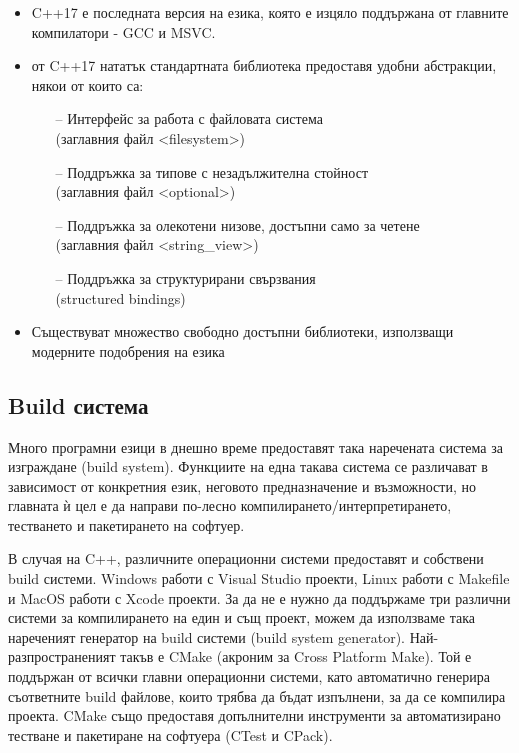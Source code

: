 \begin{itemize}
    \item C++17 е последната версия на езика, която е изцяло поддържана от
          главните компилатори - GCC и MSVC.
    \item от C++17 нататък стандартната библиотека предоставя удобни абстракции,
          някои от които са:
    \begin{itemize}
        \item[--] Интерфейс за работа с файловата система \\
                  (заглавния файл <filesystem>)
        \item[--] Поддръжка за типове с незадължителна стойност \\
                  (заглавния файл <optional>)
        \item[--] Поддръжка за олекотени низове, достъпни само за четене \\
                  (заглавния файл <string\_view>)
        \item[--] Поддръжка за структурирани свързвания \\
                  (structured bindings)
    \end{itemize}
    \item Съществуват множество свободно достъпни библиотеки, използващи
          модерните подобрения на езика
\end{itemize}


\subsection{Build система}

Много програмни езици в днешно време предоставят така наречената система за
изграждане (build system). Функциите на една такава система се различават в
зависимост от конкретния език, неговото предназначение и възможности,
но главната ѝ цел е да направи по-лесно компилирането/интерпретирането,
тестването и пакетирането на софтуер.

В случая на C++, различните операционни системи предоставят и собствени build
системи. Windows работи с Visual Studio проекти, Linux работи с Makefile и MacOS
работи с Xcode проекти. За да не е нужно да поддържаме три различни системи за
компилирането на един и същ проект, можем да използваме така нареченият
генератор на build системи (build system generator). Най-разпространеният такъв
е CMake (акроним за Cross Platform Make). Той е поддържан от всички главни
операционни системи, като автоматично генерира съответните build файлове, които
трябва да бъдат изпълнени, за да се компилира проекта. CMake също предоставя
допълнителни инструменти за автоматизирано тестване и пакетиране на софтуера
(CTest и CPack).


